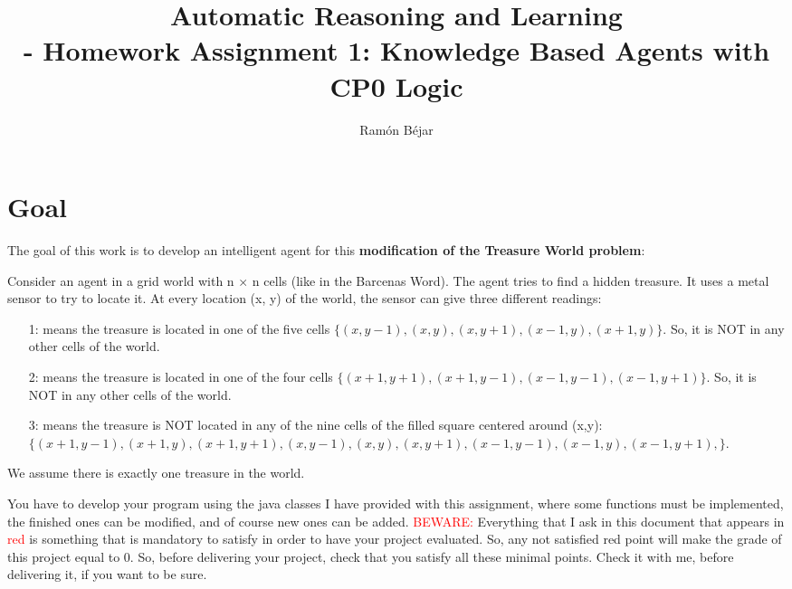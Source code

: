 \documentclass{tufte-handout}
\title[HW 1: Knowledge Based Agents]{Automatic Reasoning and Learning \\-
Homework Assignment 1: Knowledge Based Agents with  CP0 Logic}
\author[ramon]{Ram\'on B\'ejar}
\begin{document}
\maketitle

\section{Goal}

\begin{fullwidth}
The goal of this work is to develop an intelligent agent for
this \textbf{modification of the  Treasure World problem}:

\begin{mybox}
Consider an agent in a grid world with n × n cells (like in the Barcenas Word). The agent tries
to find a hidden treasure. It uses a metal sensor to try to locate it. At every location (x, y) of the
world, the sensor can give three different readings:
\begin{itemize}
\item[1:]  means the treasure is located in one of the five cells $\{(x, y-1),(x, y),(x, y+1),(x-1, y),(x+1, y)\}$.
So, it is NOT in any other cells of the world.
\item[2:] means the treasure is located in one of the four cells $ \{ ( x+1, y+1 ) , (x+1,y-1), ( x-1,y-1 ) , ( x-1, y+1 ) \} $.
So, it is NOT in any other cells of the world.
\item[3:] means the treasure is NOT located in any of the nine cells of the filled square centered
around (x,y): $\{ (x+1,y-1),(x+1,y),(x+1,y+1),
                    (x,y-1),(x,y),(x,y+1),
                (x-1,y-1),(x-1,y),(x-1,y+1), \}$.
\end{itemize}
We assume there is exactly one treasure in the world.
\end{mybox}


You have to develop your program using the java classes I have provided
with this assignment, where some functions must be implemented, the
finished ones can be modified, and of course new ones can be added.
\textcolor{red}{BEWARE:} Everything that I ask in this document that appears in
\textcolor{red}{red} is something that is mandatory to satisfy in order to have
your project evaluated. So, any not satisfied  red point will make the grade of this
project equal to 0. So, before delivering your project, check that you satisfy all these
minimal points. Check it with me, before delivering it, if you want to be sure.


\end{fullwidth}
\end{document}
